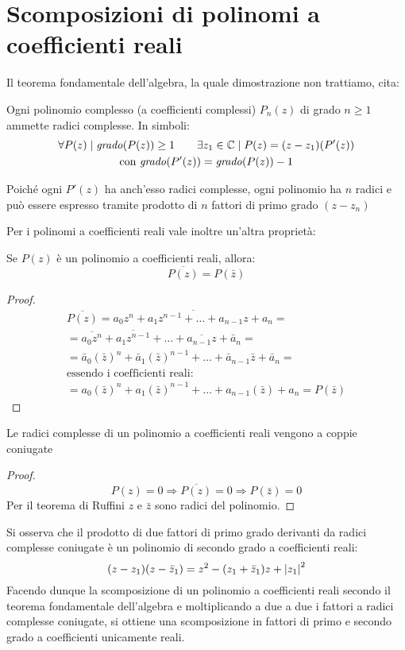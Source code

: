 \section{Scomposizioni di polinomi a coefficienti reali}
Il teorema fondamentale dell'algebra, la quale dimostrazione non trattiamo, cita:
\begin{teor}
	Ogni polinomio complesso (a coefficienti complessi) $P_n(z)$ di grado $n\geq1$ ammette radici complesse. In simboli:
	\begin{gather*}
		\forall P(z) \mid \text{\emph{grado}}(P(z))\geq1 \qquad \exists z_1\in\mathbb{C} \mid P(z)=(z-z_1)(P'(z))\\
		\text{con \emph{grado}} (P'(z))= \text{\emph{grado}} (P(z))-1
	\end{gather*}
\end{teor}
Poiché ogni $P'(z)$ ha anch'esso radici complesse, ogni polinomio ha $n$ radici e può essere espresso tramite prodotto di $n$ fattori di primo grado $(z-z_n)$

Per i polinomi a coefficienti reali vale inoltre un'altra proprietà:
\begin{teor}
	Se $P(z)$ è un polinomio a coefficienti reali, allora:
	\[
		\overline{P(z)}=P(\bar z)
	\]
\end{teor}
\begin{proof}
	\begin{gather*}
		\overline{P(z)}=\overline{a_0z^n+a_1z^{n-1}+\dots+a_{n-1}z+a_n}=\\
		=\overline{a_0z^n}+\overline{a_1z^{n-1}}+\dots+\overline{a_{n-1}z}+\bar a_n=\\
		=\bar a_0(\bar z)^n+\bar a_1(\bar z)^{n-1}+\dots+\bar a_{n-1}\bar z+\bar a_n=\\
		\text{essendo i coefficienti reali:}\\
		=a_0(\bar z)^n+a_1(\bar z)^{n-1}+\dots+a_{n-1}(\bar z)+a_n=P(\bar z)
	\end{gather*}
\end{proof}
\begin{corol}
	Le radici complesse di un polinomio a coefficienti reali vengono a coppie coniugate
\end{corol}
\begin{proof}
	\[
		P(z) = 0 \Rightarrow \overline{P(z)} = 0 \Rightarrow P(\bar z) = 0
	\]
	Per il teorema di Ruffini $z$ e $\bar z$ sono radici del polinomio.
\end{proof}
Si osserva che il prodotto di due fattori di primo grado derivanti da radici complesse coniugate è un polinomio di secondo grado a coefficienti reali:
\[
	(z-z_1)(z- \bar z_1)=z^2-(z_1+\bar z_1)z+\left\lvert z_1 \right\rvert^2
\]
Facendo dunque la scomposizione di un polinomio a coefficienti reali secondo il teorema fondamentale dell'algebra e moltiplicando a due a due i fattori a radici complesse coniugate, si ottiene una scomposizione in fattori di primo e secondo grado a coefficienti unicamente reali.

